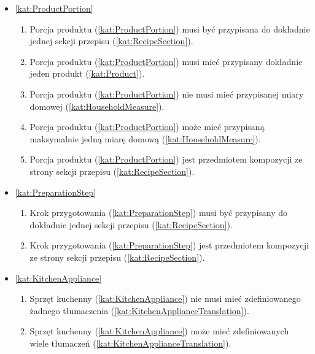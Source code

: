 \begin{itemize}[label={\textbf{Reguły dla}}, wide, labelwidth=!, labelindent=0pt]
\begin{enumerate}[label={\textbf{REG/3/\protect\twodigits{\arabic{enumi}}}}, wide, labelwidth=!, align=left, leftmargin=3cm, resume]
    \end{enumerate}
    \item\ref{kat:ProductPortion}\mynobreakpar
    \begin{enumerate}[label={\textbf{REG/3/\protect\twodigits{\arabic{enumi}}}}, wide, labelwidth=!, align=left, leftmargin=3cm, resume]
        \item Porcja produktu (\ref{kat:ProductPortion}) musi być przypisana do dokładnie jednej sekcji przepisu (\ref{kat:RecipeSection}).
        \item Porcja produktu (\ref{kat:ProductPortion}) musi mieć przypisany dokładnie jeden produkt (\ref{kat:Product}).
        \item Porcja produktu (\ref{kat:ProductPortion}) nie musi mieć przypisanej miary domowej (\ref{kat:HouseholdMeasure}).
        \item Porcja produktu (\ref{kat:ProductPortion}) może mieć przypisaną maksymalnie jedną miarę domową (\ref{kat:HouseholdMeasure}).
        \item Porcja produktu (\ref{kat:ProductPortion}) jest przedmiotem kompozycji ze strony sekcji przepisu (\ref{kat:RecipeSection}).
    \end{enumerate}
    \item\ref{kat:PreparationStep}\mynobreakpar
    \begin{enumerate}[label={\textbf{REG/3/\protect\twodigits{\arabic{enumi}}}}, wide, labelwidth=!, align=left, leftmargin=3cm, resume]
        \item Krok przygotowania (\ref{kat:PreparationStep}) musi być przypisany do dokładnie jednej sekcji przepisu (\ref{kat:RecipeSection}).
        \item Krok przygotowania (\ref{kat:PreparationStep}) jest przedmiotem kompozycji ze strony sekcji przepisu (\ref{kat:RecipeSection}).
    \end{enumerate}
    \item\ref{kat:KitchenAppliance}\mynobreakpar
    \begin{enumerate}[label={\textbf{REG/3/\protect\twodigits{\arabic{enumi}}}}, wide, labelwidth=!, align=left, leftmargin=3cm, resume]
        \item Sprzęt kuchenny (\ref{kat:KitchenAppliance}) nie musi mieć zdefiniowanego żadnego tłumaczenia (\ref{kat:KitchenApplianceTranslation}).
        \item Sprzęt kuchenny (\ref{kat:KitchenAppliance}) może mieć zdefiniowanych wiele tłumaczeń (\ref{kat:KitchenApplianceTranslation}).

\end{enumerate}
\end{itemize}
